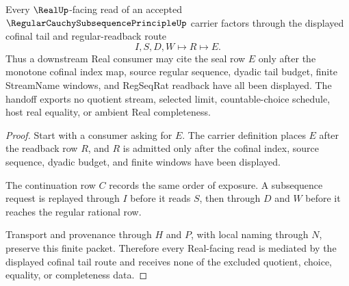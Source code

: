 \begin{theorem}
\label{thm:regular-cauchy-subsequence-principle-real-seal-handoff}
Every $\RealUp$-facing read of an accepted $\RegularCauchySubsequencePrincipleUp$ carrier factors through the displayed cofinal tail and regular-readback route
$$
I,S,D,W \longmapsto R \longmapsto E .
$$
Thus a downstream Real consumer may cite the seal row $E$ only after the monotone cofinal index map, source regular sequence, dyadic tail budget, finite StreamName windows, and RegSeqRat readback have all been displayed. The handoff exports no quotient stream, selected limit, countable-choice schedule, host real equality, or ambient Real completeness.
\end{theorem}
\begin{proof}
Start with a consumer asking for $E$. The carrier definition places $E$ after the readback row $R$, and $R$ is admitted only after the cofinal index, source sequence, dyadic budget, and finite windows have been displayed.

The continuation row $C$ records the same order of exposure. A subsequence request is replayed through $I$ before it reads $S$, then through $D$ and $W$ before it reaches the regular rational row.

Transport and provenance through $H$ and $P$, with local naming through $N$, preserve this finite packet. Therefore every Real-facing read is mediated by the displayed cofinal tail route and receives none of the excluded quotient, choice, equality, or completeness data.
\end{proof}


\begin{closurestatus}{\RegularCauchySubsequencePrincipleUp}
  \theoryclosure{\seedClosure}
  \formalstatus{\unformalizedV}
\end{closurestatus}

